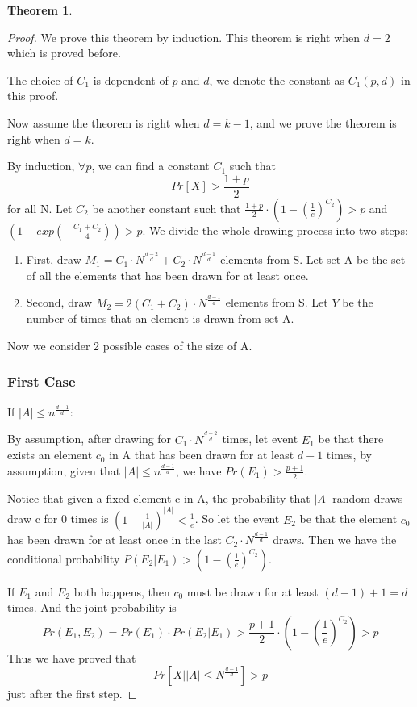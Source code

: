 \documentclass{article}
\newtheorem{theorem}{Theorem}
\begin{document}
\begin{spacing}{1.1}
\begin{theorem}
    \end{theorem}
    
    \begin{proof}
    
    We prove this theorem by induction. This theorem is right when $d=2$ which is proved before.
    
    The choice of $C_1$ is dependent of $p$ and $d$, we denote the constant as $C_1(p,d)$ in this proof.
    
    Now assume the theorem is right when $d=k-1$, and we prove the theorem is right when $d=k$.
    
    By induction, $\forall p$, we can find a constant $C_1$ such that
    $$Pr[X] > \frac{1+p}{2}$$
    for all N. Let $C_2$ be another constant such that $\frac{1+p}{2} \cdot (1 - (\frac{1}{e})^{C_2}) > p$ and $(1 - exp(-\frac{C_1 + C_2}{4})) > p$. We divide the whole drawing process into two steps:
    \begin{enumerate}
        \item First, draw $M_1 = C_1 \cdot N^{\frac{d-2}{d}} + C_2 \cdot N^{\frac{d-1}{d}}$ elements from S. Let set A be the set of all the elements that has been drawn for at least once.
        \item Second, draw $M_2 = 2(C_1 + C_2)\cdot N^{\frac{d-1}{d}}$ elements from S. Let $Y$ be the number of times that an element is drawn from set A.
    \end{enumerate}
    Now we consider 2 possible cases of the size of A.
    
    \subsubsection{First Case}
    If $|A| \leq n^{\frac{d-1}{d}}$:

    By assumption, after drawing for $C_1 \cdot N^{\frac{d-2}{d}}$ times, let event $E_1$ be that there exists an element $c_0$ in A that has been drawn for at least $d-1$ times, by assumption, given that $|A| \leq n^{\frac{d-1}{d}}$, we have $Pr(E_1) > \frac{p+1}{2}$.

    Notice that given a fixed element c in A, the probability that $|A|$ random draws draw c for 0 times is $(1 - \frac{1}{|A|})^{|A|} < \frac{1}{e}$. So let the event $E_2$ be that the element $c_0$ has been drawn for at least once in the last $C_2 \cdot N^{\frac{d-1}{d}}$ draws. Then we have the conditional probability $P(E_2|E_1) > (1 - (\frac{1}{e})^{C_2})$.

    If $E_1$ and $E_2$ both happens, then $c_0$ must be drawn for at least $(d-1) + 1 = d$ times. And the joint probability is
    \begin{equation}
        Pr(E_1, E_2) = Pr(E_1)\cdot Pr(E_2 | E_1) > \frac{p+1}{2} \cdot (1 - (\frac{1}{e})^{C_2}) > p
    \end{equation}
    Thus we have proved that $$Pr[X | |A| \leq N^{\frac{d-1}{d}}] > p$$ just after the first step.

\end{proof}
\end{spacing}
\end{document}
